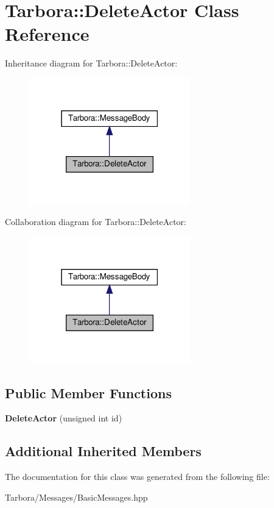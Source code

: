 \hypertarget{classTarbora_1_1DeleteActor}{}\section{Tarbora\+:\+:Delete\+Actor Class Reference}
\label{classTarbora_1_1DeleteActor}


Inheritance diagram for Tarbora\+:\+:Delete\+Actor\+:
\nopagebreak
\begin{figure}[H]
\begin{center}
\leavevmode
\includegraphics[width=198pt]{classTarbora_1_1DeleteActor__inherit__graph}
\end{center}
\end{figure}


Collaboration diagram for Tarbora\+:\+:Delete\+Actor\+:
\nopagebreak
\begin{figure}[H]
\begin{center}
\leavevmode
\includegraphics[width=198pt]{classTarbora_1_1DeleteActor__coll__graph}
\end{center}
\end{figure}
\subsection*{Public Member Functions}
\begin{DoxyCompactItemize}
\item 
\mbox{\label{classTarbora_1_1DeleteActor_a9894f0a89192f715b69ba8fd874f8270}} 
{\bfseries Delete\+Actor} (unsigned int id)
\end{DoxyCompactItemize}
\subsection*{Additional Inherited Members}


The documentation for this class was generated from the following file\+:\begin{DoxyCompactItemize}
\item 
Tarbora/\+Messages/Basic\+Messages.\+hpp\end{DoxyCompactItemize}

